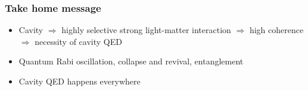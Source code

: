 \documentclass[t]{beamer}
\begin{document}
\begin{frame}
\frametitle{Take home message}

\begin{itemize}
    \item Cavity $\Rightarrow$ highly selective strong light-matter interaction $\Rightarrow$ high coherence $\Rightarrow$ necessity of cavity QED 
    \item Quantum Rabi oscillation, collapse and revival, entanglement
    \item Cavity QED happens everywhere
\end{itemize}

\end{frame}
\end{document}

